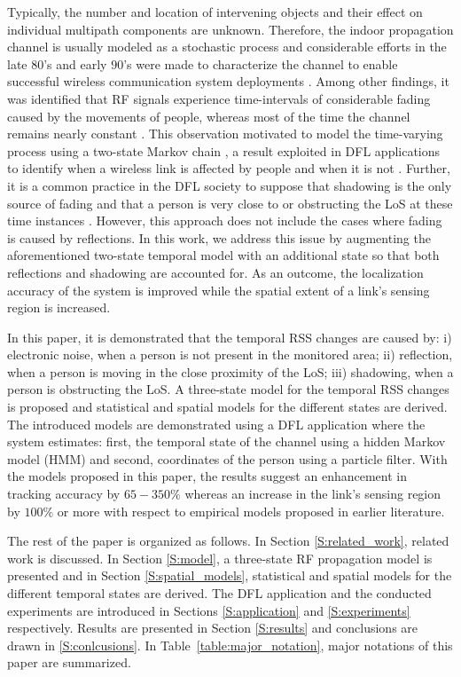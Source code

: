 \documentclass[journal, 10pt, twocolumn, balance]{IEEEtran}
\begin{document}
Typically, the number and location of intervening objects and their effect on individual multipath components are unknown. Therefore, the indoor propagation channel is usually modeled as a stochastic process \cite[Ch. 5]{Molisch2010} and considerable efforts in the late $80$'s and early $90$'s were made to characterize the channel to enable successful wireless communication system deployments \cite{hashemi93}. Among other findings, it was identified that RF signals experience time-intervals of considerable fading caused by the movements of people, whereas most of the time the channel remains nearly constant \cite{bultitude1987, hashemi94}. This observation motivated to model the time-varying process using a two-state Markov chain \cite{roberts1995}, a result exploited in DFL applications to identify when a wireless link is affected by people and when it is not \cite{Wilson2012, Zheng2012}. Further, it is a common practice in the DFL society to suppose that shadowing is the only source of fading and that a person is very close to or obstructing the LoS at these time instances \cite{Wilson2010,li2011,Kaltiokallio2012}. However, this approach does not include the cases where fading is caused by reflections. In this work, we address this issue by augmenting the aforementioned two-state temporal model with an additional state so that both reflections and shadowing are accounted for. As an outcome, the localization accuracy of the system is improved while the spatial extent of a link's sensing region is increased.

In this paper, it is demonstrated that the temporal RSS changes are caused by: i) electronic noise, when a person is not present in the monitored area; ii) reflection, when a person is moving in the close proximity of the LoS; iii) shadowing, when a person is obstructing the LoS. A three-state model for the temporal RSS changes is proposed and statistical and spatial models for the different states are derived. The introduced models are demonstrated using a DFL application where the system estimates: first, the temporal state of the channel using a hidden Markov model (HMM) and second, coordinates of the person using a particle filter. With the models proposed in this paper, the results suggest an enhancement in tracking accuracy by $65 - 350 \%$ whereas an increase in the link's sensing region by $100 \%$ or more with respect to empirical models proposed in earlier literature.

The rest of the paper is organized as follows. In Section \ref{S:related_work}, related work is discussed. In Section \ref{S:model}, a three-state RF propagation model is presented and in Section \ref{S:spatial_models}, statistical and spatial models for the different temporal states are derived. The DFL application and the conducted experiments are introduced in Sections \ref{S:application} and \ref{S:experiments} respectively. Results are presented in Section \ref{S:results} and conclusions are drawn in \ref{S:conlcusions}. In Table~\ref{table:major_notation}, major notations of this paper are summarized.
\end{document}

